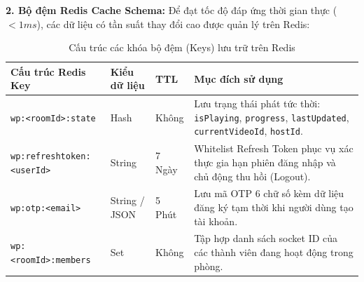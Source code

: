 \documentclass[12pt,a4paper]{extarticle}
\begin{document}
\textbf{2. Bộ đệm Redis Cache Schema:} Để đạt tốc độ đáp ứng thời gian thực ($<1ms$), các dữ liệu có tần suất thay đổi cao được quản lý trên Redis:

\begin{table}[H]
\centering
\small
\caption{Cấu trúc các khóa bộ đệm (Keys) lưu trữ trên Redis}
\label{tab:redis_keys}
\renewcommand{\arraystretch}{1.3}
\begin{tabular}{|p{4.2cm}|p{2.5cm}|p{1.8cm}|p{6.5cm}|}
\hline
\textbf{Cấu trúc Redis Key} & \textbf{Kiểu dữ liệu} & \textbf{TTL} & \textbf{Mục đích sử dụng} \\ \hline
\texttt{wp:<roomId>:state} & Hash & Không & Lưu trạng thái phát tức thời: \texttt{isPlaying}, \texttt{progress}, \texttt{lastUpdated}, \texttt{currentVideoId}, \texttt{hostId}. \\ \hline
\texttt{wp:refreshtoken:<userId>} & String & 7 Ngày & Whitelist Refresh Token phục vụ xác thực gia hạn phiên đăng nhập và chủ động thu hồi (Logout). \\ \hline
\texttt{wp:otp:<email>} & String / JSON & 5 Phút & Lưu mã OTP 6 chữ số kèm dữ liệu đăng ký tạm thời khi người dùng tạo tài khoản. \\ \hline
\texttt{wp:<roomId>:members} & Set & Không & Tập hợp danh sách socket ID của các thành viên đang hoạt động trong phòng. \\ \hline
\end{tabular}
\end{table}
\end{document}
